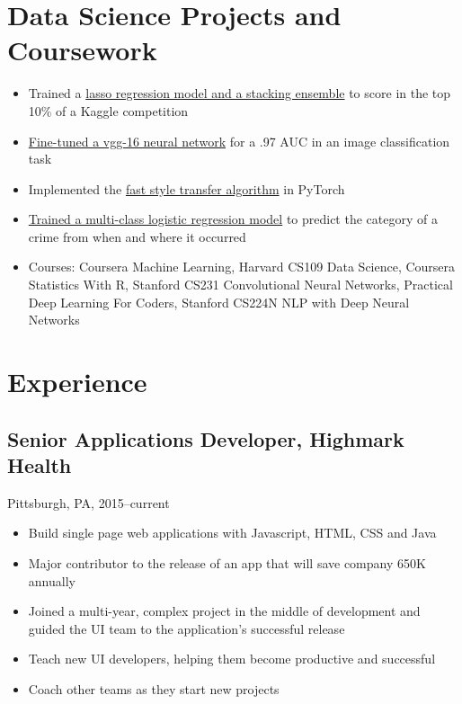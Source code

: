 \documentclass[11pt]{article}
\begin{document}
	\section{Data Science Projects and Coursework}
		\begin{itemize}
			\item Trained a \href{https://github.com/ryankresse/ames_housing}{lasso regression model and a stacking ensemble} to score in the top 10\% of a Kaggle competition
			\item \href{https://github.com/ryankresse/invasive_species}{Fine-tuned a vgg-16 neural network} for a .97 AUC in an image classification task 
			\item Implemented the \href{https://github.com/ryankresse/fast_style_transfer_pytorch}{fast style transfer algorithm} in PyTorch
			\item \href{https://github.com/ryankresse/sf-crime}{Trained a multi-class logistic regression model} to predict the category of a crime from when and where it occurred
			\item Courses: Coursera Machine Learning, Harvard CS109 Data Science, Coursera Statistics With R, Stanford CS231 Convolutional Neural Networks, Practical Deep Learning For Coders, Stanford CS224N NLP with Deep Neural Networks
		\end{itemize}
		
	\section{Experience}
			\subsection{\normalsize{Senior Applications Developer, Highmark Health}}
			{\fontsize{10pt}{\parskip}\selectfont Pittsburgh, PA, 2015--current}
		\begin{itemize}
		\item Build single page web applications with Javascript, HTML, CSS and Java
		\item Major contributor to the release of an app that will save company 650K annually
		\item Joined a multi-year, complex project in the middle of development and guided the UI team to the application's successful release
		\item Teach new UI developers, helping them become productive and successful
		\item Coach other teams as they start new projects
		\end{itemize}
		
\end{document}
